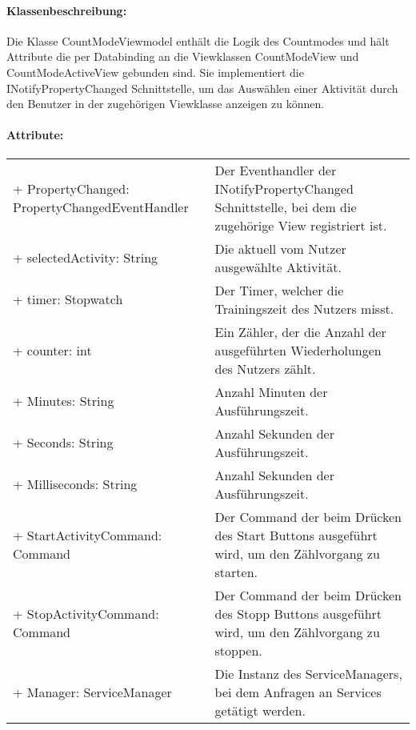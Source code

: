 \documentclass[a4paper,12pt]{article}
\begin{document}
\paragraph{Klassenbeschreibung:}
Die Klasse CountModeViewmodel enthält die Logik des Countmodes und hält Attribute die per Databinding an die Viewklassen CountModeView und CountModeActiveView gebunden sind. Sie implementiert die INotifyPropertyChanged Schnittstelle, um das Auswählen einer Aktivität durch den Benutzer in der zugehörigen Viewklasse anzeigen zu können.
\paragraph{Attribute:}
\begin{tabular}{p{7cm}p{10cm}}
+ PropertyChanged: PropertyChangedEventHandler & Der Eventhandler der INotifyPropertyChanged Schnittstelle, bei dem die zugehörige View registriert ist. \\
+ selectedActivity: String & Die aktuell vom Nutzer ausgewählte Aktivität. \\
+ timer: Stopwatch & Der Timer, welcher die Trainingszeit des Nutzers misst. \\
+ counter: int & Ein Zähler, der die Anzahl der ausgeführten Wiederholungen des Nutzers zählt. \\
+ Minutes: String & Anzahl Minuten der Ausführungszeit. \\
+ Seconds: String & Anzahl Sekunden der Ausführungszeit. \\
+ Milliseconds: String & Anzahl Sekunden der Ausführungszeit. \\ 
+ StartActivityCommand: Command & Der Command der beim Drücken des Start Buttons ausgeführt wird, um den Zählvorgang zu starten. \\
+ StopActivityCommand: Command & Der Command der beim Drücken des Stopp Buttons ausgeführt wird, um den Zählvorgang zu stoppen. \\
+ Manager: ServiceManager & Die Instanz des ServiceManagers, bei dem Anfragen an Services getätigt werden. \\
\end{tabular}
\end{document}
